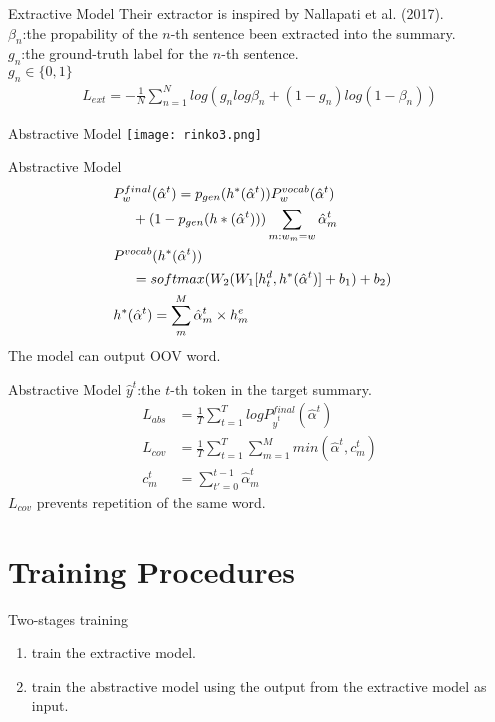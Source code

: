 \documentclass[17pt, unicode,dvipdfmx]{beamer}
\begin{document}
\begin{frame}{Extractive Model}
  \small
  Their extractor is inspired by Nallapati et al. (2017).\\
  $\beta_n$:the propability of the $n$-th sentence been extracted into the summary.\\
  $g_n$:the ground-truth label for the $n$-th sentence.\\$g_n\in \{0,1\}$
  \begin{align}
    L_{ext}=-\frac{1}{N}\sum_{n=1}^N log(g_n log \beta_n+(1-g_n)log(1-\beta_n))
  \end{align}
\end{frame}


\begin{frame}{Abstractive Model}
\texttt{[image: rinko3.png]}
\end{frame}

\begin{frame}{Abstractive Model}
  \small
  \begin{align}
    &P_w^{final}(\hat{\alpha}^t)=p_{gen}(h^*(\hat{\alpha}^t))P_w^{vocab}(\hat{\alpha}^t)\notag \\
    &~~~~+(1-p_{gen}(h*(\hat{\alpha}^t)))\sum_{m:w_m=w}\hat{\alpha}_m^t\\
    &P^{vocab}(h^*(\hat{\alpha}^t))\notag &\\
    &~~~~=softmax(W_2(W_1[h_t^d,h^*(\hat{\alpha}^t)]+b_1)+b_2)\\
    &h^*(\hat{\alpha}^t)=\sum_m^M \hat{\alpha}_m^t\times h_m^e
  \end{align}
  The model can output OOV word.
\end{frame}


\begin{frame}{Abstractive Model}
  \small
  $\hat{y}^t$:the $t$-th token in the target summary.
  \begin{align}
    L_{abs}&=\frac{1}{T} \sum_{t=1}^T log P_{\hat{y}^t}^{final}(\hat{\alpha}^t)\\
    L_{cov}&=\frac{1}{T} \sum_{t=1}^T \sum_{m=1}^M min(\hat{\alpha}^t,c_m^t)\\
    c_m^t &= \sum_{t'=0}^{t-1}\hat{\alpha}^t_m
  \end{align}
  $L_{cov}$ prevents repetition of the same word.
\end{frame}

\section{Training Procedures}
\begin{frame}{Two-stages training}
  \begin{enumerate}
    \item train the extractive model.
    \item train the abstractive model using the output from the extractive model as input.
  \end{enumerate}
\end{frame}
\end{document}
